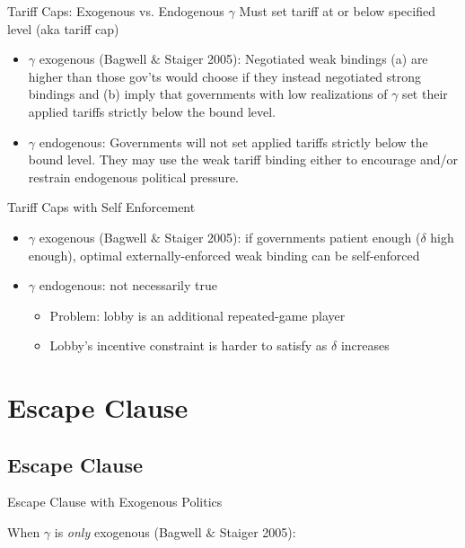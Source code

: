 \documentclass[handout]{beamer}
\newcommand{\ga}{\gamma}
\newcommand{\de}{\delta}
\begin{document}
{\begin{frame}{Tariff Caps: Exogenous vs. Endogenous $\ga$}
\pause
Must set tariff at or below specified level (aka tariff cap)
\pause
\begin{itemize}[<+->]
	\item $\ga$ exogenous (Bagwell $\&$ Staiger 2005): Negotiated weak bindings (a) are higher than those gov'ts would choose if they instead negotiated strong bindings and (b) imply that governments with low realizations of $\ga$ set their applied tariffs strictly below the bound level.

	\item $\ga$ endogenous: Governments will not set applied tariffs strictly below the bound level. They may use the weak tariff binding either to encourage and/or restrain endogenous political pressure.

\end{itemize}
\end{frame}


\begin{frame}{Tariff Caps with Self Enforcement}
\pause
\begin{itemize}[<+->]
	\item $\ga$ exogenous (Bagwell $\&$ Staiger 2005): if governments patient enough ($\de$ high enough), optimal externally-enforced weak binding can be self-enforced
  \item $\ga$ endogenous: not necessarily true
		\begin{itemize}
			\item Problem: lobby is an additional repeated-game player
			\item Lobby's incentive constraint is harder to satisfy as $\de$ increases
		\end{itemize}
	 
\end{itemize}

\end{frame}



\section{Escape Clause}
\subsection{Escape Clause}
\begin{frame}{Escape Clause with Exogenous Politics}

\pause
When $\ga$ is \textit{only} exogenous (Bagwell $\&$ Staiger 2005):


\end{frame}}
\end{document}
